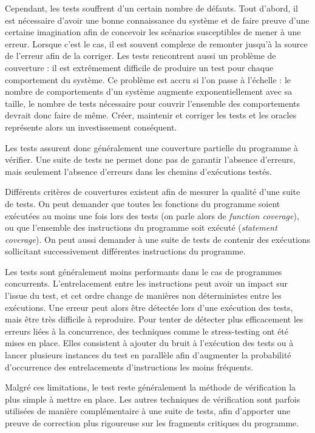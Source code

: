 Cependant, les tests souffrent d'un certain nombre de
défauts. Tout d'abord, il est nécessaire d'avoir une bonne connaissance
du système et de faire preuve d'une certaine imagination afin de
concevoir les scénarios susceptibles de mener à une erreur. Lorsque
c'est le cas, il est souvent complexe de remonter jusqu'à la source de
l'erreur afin de la corriger. Les tests rencontrent aussi un problème de
couverture : il est extrêmement difficile de produire un test pour
chaque comportement du système. Ce problème est accru si l'on passe à
l'échelle : le nombre de comportements d'un système augmente
exponentiellement avec sa taille, le nombre de tests nécessaire pour
couvrir l'ensemble des comportements devrait donc faire de même. Créer, maintenir et
corriger les tests et les oracles représente alors un investissement conséquent.

Les tests assurent donc généralement une couverture partielle du
programme à vérifier. Une suite de tests ne permet donc pas de garantir
l'absence d'erreurs, mais seulement l'absence d'erreurs dans les chemins
d'exécutions testés.

Différents critères de couvertures existent afin de mesurer la qualité
d'une suite de tests. On peut demander que toutes les fonctions du
programme soient exécutées au moins une fois lors des tests (on parle
alors de \emph{function coverage}), ou que l'ensemble des instructions
du programme soit exécuté (\emph{statement coverage}). On peut aussi
demander à une suite de tests de contenir des exécutions sollicitant
successivement différentes instructions du programme.

Les tests sont généralement moins performants dans le cas de programmes
concurrents. L'entrelacement entre les instructions peut avoir un impact
sur l'issue du test, et cet ordre change de manières non déterministes
entre les exécutions. Une erreur peut alors être détectée lors d'une
exécution des tests, mais être très difficile à reproduire. Pour tenter
de détecter plus efficacement les erreurs liées à la concurrence, des
techniques comme le stress-testing ont été mises en place. Elles
consistent à ajouter du bruit à l'exécution des tests ou à lancer
plusieurs instances du test en parallèle afin d'augmenter la probabilité
d'occurrence des entrelacements d'instructions les moins fréquents.

Malgré ces limitations, le test reste généralement la méthode de
vérification la plus simple à mettre en place. Les autres techniques de
vérification sont parfois utilisées de manière complémentaire à une
suite de tests, afin d'apporter une preuve de correction plus rigoureuse
sur les fragments critiques du programme.


